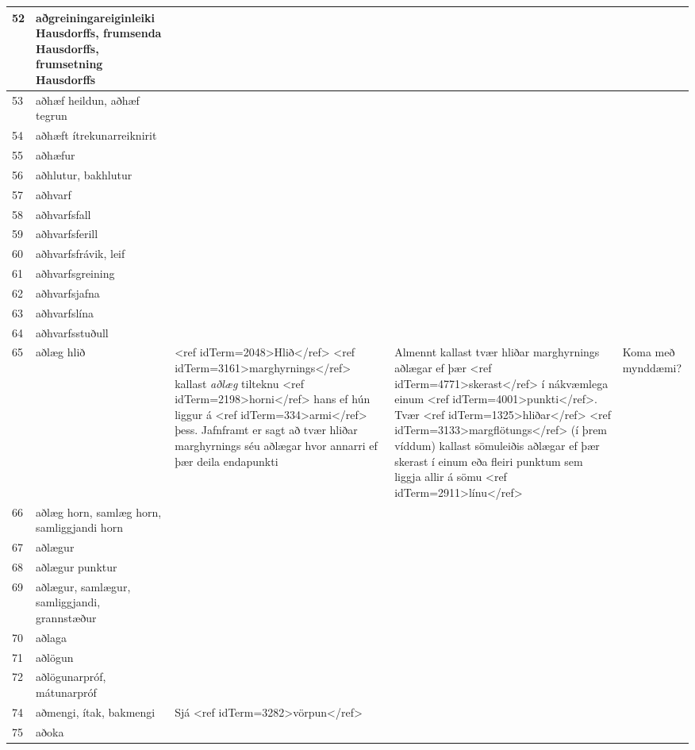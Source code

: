 \begin{longtable}{p{}|p{}|p{}|p{}|p{}}
\hline
52 & aðgreiningareiginleiki Hausdorffs, frumsenda Hausdorffs, frumsetning Hausdorffs &  &  &  \\
\hline
53 & aðhæf heildun, aðhæf tegrun &  &  &  \\
\hline
54 & aðhæft ítrekunarreiknirit &  &  &  \\
\hline
55 & aðhæfur &  &  &  \\
\hline
56 & aðhlutur, bakhlutur &  &  &  \\
\hline
57 & aðhvarf &  &  &  \\
\hline
58 & aðhvarfsfall &  &  &  \\
\hline
59 & aðhvarfsferill &  &  &  \\
\hline
60 & aðhvarfsfrávik, leif &  &  &  \\
\hline
61 & aðhvarfsgreining &  &  &  \\
\hline
62 & aðhvarfsjafna &  &  &  \\
\hline
63 & aðhvarfslína &  &  &  \\
\hline
64 & aðhvarfsstuðull &  &  &  \\
\hline
65 & aðlæg hlið & <ref idTerm=2048>Hlið</ref> <ref idTerm=3161>marghyrnings</ref> kallast \textit{aðlæg} tilteknu <ref idTerm=2198>horni</ref> hans ef hún liggur á <ref idTerm=334>armi</ref> þess. Jafnframt er sagt að tvær hliðar marghyrnings séu aðlægar hvor annarri ef þær deila endapunkti & Almennt kallast tvær hliðar marghyrnings aðlægar ef þær <ref idTerm=4771>skerast</ref> í nákvæmlega einum <ref idTerm=4001>punkti</ref>. Tvær <ref idTerm=1325>hliðar</ref> <ref idTerm=3133>margflötungs</ref> (í þrem víddum) kallast sömuleiðis aðlægar ef þær skerast í einum eða fleiri punktum sem liggja allir á sömu <ref idTerm=2911>línu</ref> & Koma með mynddæmi? \\
\hline
66 & aðlæg horn, samlæg horn, samliggjandi horn &  &  &  \\
\hline
67 & aðlægur &  &  &  \\
\hline
68 & aðlægur punktur &  &  &  \\
\hline
69 & aðlægur, samlægur, samliggjandi, grannstæður &  &  &  \\
\hline
70 & aðlaga &  &  &  \\
\hline
71 & aðlögun &  &  &  \\
\hline
72 & aðlögunarpróf, mátunarpróf &  &  &  \\
\hline
74 & aðmengi, ítak, bakmengi & Sjá <ref idTerm=3282>vörpun</ref> &  &  \\
\hline
75 & aðoka &  &  &  \\

\end{longtable}
